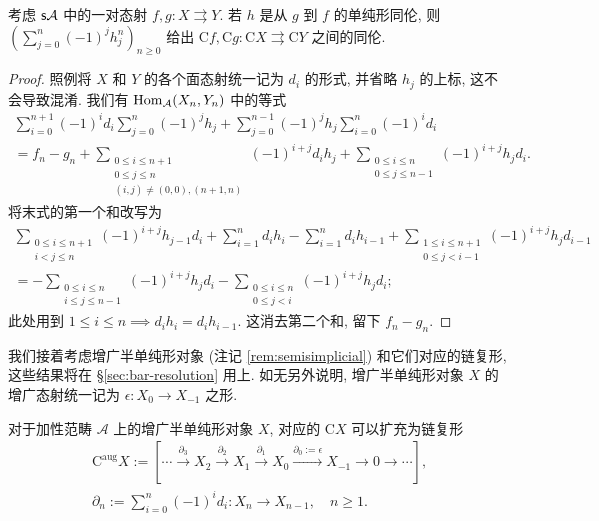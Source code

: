 \begin{proposition}
	考虑 $\mathsf{s}\mathcal{A}$ 中的一对态射 $f, g: X \rightrightarrows Y$. 若 $h$ 是从 $g$ 到 $f$ 的单纯形同伦, 则 $\left( \sum_{j=0}^n (-1)^j h^n_j \right)_{n \geq 0}$ 给出 $\mathrm{C}f, \mathrm{C}g: \mathrm{C}X \rightrightarrows \mathrm{C}Y$ 之间的同伦.
\end{proposition}
\begin{proof}
	照例将 $X$ 和 $Y$ 的各个面态射统一记为 $d_i$ 的形式, 并省略 $h_j$ 的上标, 这不会导致混淆. 我们有 $\operatorname{Hom}_{\mathcal{A}}(X_n, Y_n)$ 中的等式
	\begin{multline*}
		\sum_{i=0}^{n+1} (-1)^i d_i \sum_{j=0}^n (-1)^j h_j + \sum_{j=0}^{n-1} (-1)^j h_j \sum_{i=0}^n (-1)^i d_i \\
		= f_n - g_n
		+ \sum_{\substack{0 \leq i \leq n+1 \\ 0 \leq j \leq n \\ (i,j) \neq (0, 0), (n+1, n)}} (-1)^{i+j} d_i h_j
		+ \sum_{\substack{0 \leq i \leq n \\ 0 \leq j \leq n-1}} (-1)^{i+j} h_j d_i .
	\end{multline*}
	将末式的第一个和改写为
	\begin{align*}
		\sum_{\substack{0 \leq i \leq n+1 \\ i < j \leq n}} (-1)^{i+j} h_{j-1} d_i
		+ \sum_{i=1}^n d_i h_i - \sum_{i=1}^n d_i h_{i-1} 
		+ \sum_{\substack{1 \leq i \leq n+1 \\ 0 \leq j < i-1}} (-1)^{i+j} h_j d_{i-1} \\
		= -\sum_{\substack{0 \leq i \leq n \\ i \leq j \leq n-1}} (-1)^{i+j} h_j d_i
		- \sum_{\substack{0 \leq i \leq n \\ 0 \leq j < i}} (-1)^{i+j} h_j d_i ;
	\end{align*}
	此处用到 $1 \leq i \leq n \implies d_i h_i = d_i h_{i-1}$. 这消去第二个和, 留下 $f_n - g_n$.
\end{proof}

我们接着考虑增广半单纯形对象 (注记 \ref{rem:semisimplicial}) 和它们对应的链复形, 这些结果将在 \S\ref{sec:bar-resolution} 用上. 如无另外说明, 增广半单纯形对象 $X$ 的增广态射统一记为 $\epsilon: X_0 \to X_{-1}$ 之形.

\begin{definition}\label{def:augmented-C-cplx}
	对于加性范畴 $\mathcal{A}$ 上的增广半单纯形对象 $X$, 对应的 $\mathrm{C}X$ 可以扩充为链复形
	\begin{equation*}
		\begin{gathered}
			\mathrm{C}^{\mathrm{aug}} X := \left[ \cdots \xrightarrow{\partial_3} X_2 \xrightarrow{\partial_2} X_1 \xrightarrow{\partial_1} X_0 \xrightarrow{\partial_0 := \epsilon} X_{-1} \to 0 \to \cdots \right] , \\
			\partial_n := \sum_{i=0}^n (-1)^i d_i : X_n \to X_{n-1}, \quad n \geq 1.
		\end{gathered}
	\end{equation*}
\end{definition}

